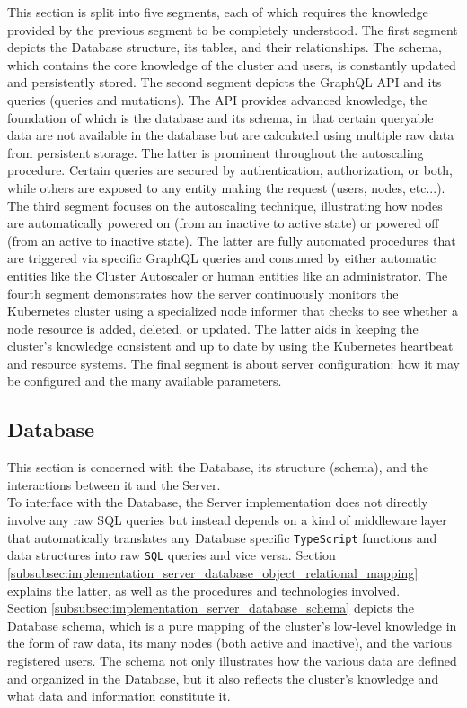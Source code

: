 This section is split into five segments, each of which requires the knowledge provided
by the previous segment to be completely understood. The first segment depicts
the Database structure, its tables, and their relationships. The schema, which
contains the core knowledge of the cluster and users, is constantly updated and persistently
stored. The second segment depicts the GraphQL API and its queries (queries and mutations).
The API provides advanced knowledge, the foundation of which is the database and
its schema, in that certain queryable data are not available in the database but
are calculated using multiple raw data from persistent storage. The latter is
prominent throughout the autoscaling procedure. Certain queries are secured by authentication,
authorization, or both, while others are exposed to any entity making the
request (users, nodes, etc...). The third segment focuses on the autoscaling
technique, illustrating how nodes are automatically powered on (from an inactive
to active state) or powered off (from an active to inactive state). The latter
are fully automated procedures that are triggered via specific GraphQL queries
and consumed by either automatic entities like the Cluster Autoscaler or human
entities like an administrator. The fourth segment demonstrates how the server continuously
monitors the Kubernetes cluster using a specialized node informer that checks to
see whether a node resource is added, deleted, or updated. The latter aids in
keeping the cluster's knowledge consistent and up to date by using the
Kubernetes heartbeat and resource systems. The final segment is about server configuration:
how it may be configured and the many available parameters.

\subsection{Database}
\label{subsec:implementation_server_database}

This section is concerned with the Database, its structure (schema), and the interactions
between it and the Server. \\ %
To interface with the Database, the Server implementation does not directly
involve any raw SQL queries but instead depends on a kind of middleware layer
that automatically translates any Database specific \texttt{TypeScript} functions
and data structures into raw \texttt{SQL} queries and vice versa. Section \ref{subsubsec:implementation_server_database_object_relational_mapping}
explains the latter, as well as the procedures and technologies involved. \\ %
Section \ref{subsubsec:implementation_server_database_schema} depicts the
Database schema, which is a pure mapping of the cluster's low-level knowledge in
the form of raw data, its many nodes (both active and inactive), and the various
registered users. The schema not only illustrates how the various data are
defined and organized in the Database, but it also reflects the cluster's knowledge
and what data and information constitute it.

